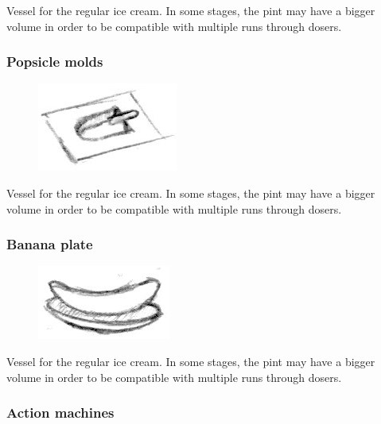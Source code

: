 \documentclass[a4paper]{scrartcl}
\begin{document}
            Vessel for the regular ice cream. In some stages, the pint may have
            a bigger volume in order to be compatible with multiple runs through
            dosers.

        \subsubsection{Popsicle molds}
            \begin{figure}
                \vspace{-15pt}
                \includegraphics[scale=1]{devices/popsicle_molds}
                \vspace{-25pt}
            \end{figure}

            Vessel for the regular ice cream. In some stages, the pint may have
            a bigger volume in order to be compatible with multiple runs through
            dosers.

        \subsubsection{Banana plate}
            \begin{figure}
                \vspace{-15pt}
                \includegraphics[scale=1]{devices/banana_plate}
                \vspace{-25pt}
            \end{figure}

            Vessel for the regular ice cream. In some stages, the pint may have
            a bigger volume in order to be compatible with multiple runs through
            dosers.

    \subsubsection{Action machines}
\end{document}
